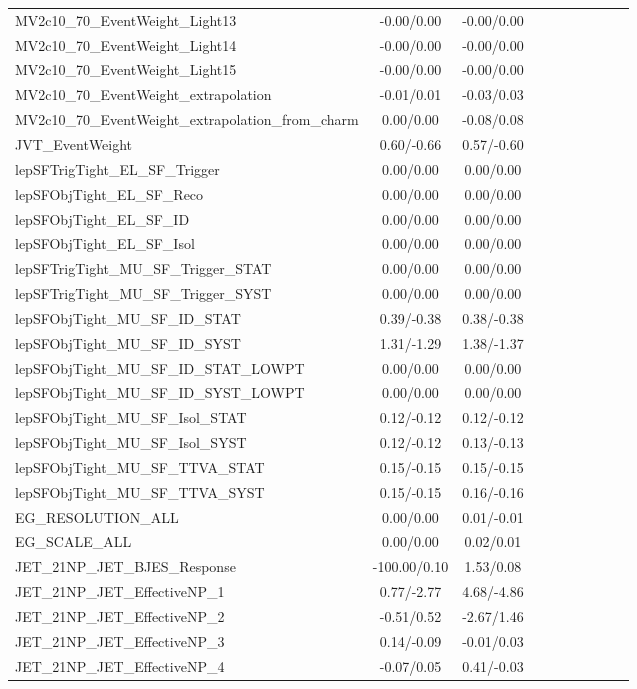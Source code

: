 \begin{table}[h]
\begin{center}
\begin{tabular}{l|ccccccccc}
MV2c10\_70\_EventWeight\_Light13 &-0.00/0.00 &-0.00/0.00 \\
MV2c10\_70\_EventWeight\_Light14 &-0.00/0.00 &-0.00/0.00 \\
MV2c10\_70\_EventWeight\_Light15 &-0.00/0.00 &-0.00/0.00 \\
MV2c10\_70\_EventWeight\_extrapolation &-0.01/0.01 &-0.03/0.03 \\
MV2c10\_70\_EventWeight\_extrapolation\_from\_charm &0.00/0.00 &-0.08/0.08 \\
JVT\_EventWeight &0.60/-0.66 &0.57/-0.60 \\
lepSFTrigTight\_EL\_SF\_Trigger &0.00/0.00 &0.00/0.00 \\
lepSFObjTight\_EL\_SF\_Reco &0.00/0.00 &0.00/0.00 \\
lepSFObjTight\_EL\_SF\_ID &0.00/0.00 &0.00/0.00 \\
lepSFObjTight\_EL\_SF\_Isol &0.00/0.00 &0.00/0.00 \\
lepSFTrigTight\_MU\_SF\_Trigger\_STAT &0.00/0.00 &0.00/0.00 \\
lepSFTrigTight\_MU\_SF\_Trigger\_SYST &0.00/0.00 &0.00/0.00 \\
lepSFObjTight\_MU\_SF\_ID\_STAT &0.39/-0.38 &0.38/-0.38 \\
lepSFObjTight\_MU\_SF\_ID\_SYST &1.31/-1.29 &1.38/-1.37 \\
lepSFObjTight\_MU\_SF\_ID\_STAT\_LOWPT &0.00/0.00 &0.00/0.00 \\
lepSFObjTight\_MU\_SF\_ID\_SYST\_LOWPT &0.00/0.00 &0.00/0.00 \\
lepSFObjTight\_MU\_SF\_Isol\_STAT &0.12/-0.12 &0.12/-0.12 \\
lepSFObjTight\_MU\_SF\_Isol\_SYST &0.12/-0.12 &0.13/-0.13 \\
lepSFObjTight\_MU\_SF\_TTVA\_STAT &0.15/-0.15 &0.15/-0.15 \\
lepSFObjTight\_MU\_SF\_TTVA\_SYST &0.15/-0.15 &0.16/-0.16 \\
EG\_RESOLUTION\_ALL &0.00/0.00 &0.01/-0.01 \\
EG\_SCALE\_ALL &0.00/0.00 &0.02/0.01 \\
JET\_21NP\_JET\_BJES\_Response &-100.00/0.10 &1.53/0.08 \\
JET\_21NP\_JET\_EffectiveNP\_1 &0.77/-2.77 &4.68/-4.86 \\
JET\_21NP\_JET\_EffectiveNP\_2 &-0.51/0.52 &-2.67/1.46 \\
JET\_21NP\_JET\_EffectiveNP\_3 &0.14/-0.09 &-0.01/0.03 \\
JET\_21NP\_JET\_EffectiveNP\_4 &-0.07/0.05 &0.41/-0.03 \\

\end{tabular}
\end{center}
\end{table}
